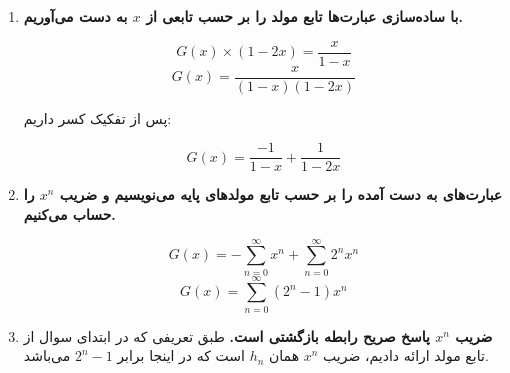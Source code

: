 \begin{PROBLEM}
{\begin{enumerate}[label=\arabic*)]
            $$G(x) - 0 = 2xG(x) + x\frac{1}{1 - x}$$
            
            \item
            \textbf{
                با ساده‌سازی عبارت‌ها تابع مولد را بر حسب تابعی از $x$ به دست می‌آوریم.
            }
            
            $$G(x) \times (1 - 2x) = \frac{x}{1 - x}$$
            $$G(x) = \frac{x}{(1 - x)(1 - 2x)}$$
            
            پس از تفکیک کسر داریم:
            
            $$G(x) = \frac{-1}{1 - x} + \frac{1}{1 - 2x}$$
            
            \item
            \textbf{
                عبارت‌های به دست آمده را بر حسب تابع مولد‌های پایه می‌نویسیم و ضریب $x^n$ را حساب می‌کنیم.
            }
            
            $$G(x) = -\sum_{n = 0}^{\infty} x^n + \sum_{n = 0}^{\infty} 2^nx^n$$
            $$G(x) = \sum_{n = 0}^{\infty} (2^n - 1)x^n$$
            
            \item
            \textbf{
                ضریب $x^n$ پاسخ صریح رابطه بازگشتی است.
            }
            \p
            طبق تعریفی که در ابتدای سوال از تابع مولد ارائه دادیم، ضریب $x^n$ همان $h_n$ است
            که در اینجا برابر
            $2^n - 1$
            می‌باشد.
        \end{enumerate}
    }
\end{PROBLEM}